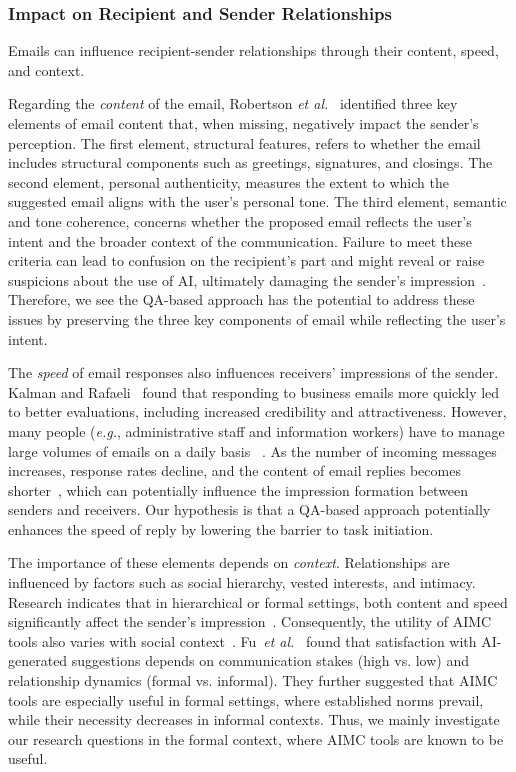 \subsubsection{Impact on Recipient and Sender Relationships}
Emails can influence recipient-sender relationships through their content, speed, and context. 

Regarding the \textit{content} of the email, Robertson \textit{et al.}~\cite{Robertson2021ICant} identified three key elements of email content that, when missing, negatively impact the sender’s perception.
The first element, structural features, refers to whether the email includes structural components such as greetings, signatures, and closings. 
The second element, personal authenticity, measures the extent to which the suggested email aligns with the user’s personal tone. 
The third element, semantic and tone coherence, concerns whether the proposed email reflects the user’s intent and the broader context of the communication.
Failure to meet these criteria can lead to confusion on the recipient’s part and might reveal or raise suspicions about the use of AI, ultimately damaging the sender’s impression~\cite{hohenstein2023artificial, Jakesch2019AI-Mediated, Liu2022Will}. 
Therefore, we see the QA-based approach has the potential to address these issues by preserving the three key components of email while reflecting the user’s intent.

The \textit{speed} of email responses also influences receivers' impressions of the sender. 
Kalman and Rafaeli~\cite{yoram2011online} found that responding to business emails more quickly led to better evaluations, including increased credibility and attractiveness.
However, many people (\textit{e.g.}, administrative staff and information workers) have to manage large volumes of emails on a daily basis ~\cite{McKinseySocialEconomy}. 
As the number of incoming messages increases, response rates decline, and the content of email replies becomes shorter~\cite{kooti2015evolution}, which can potentially influence the impression formation between senders and receivers.
Our hypothesis is that a QA-based approach potentially enhances the speed of reply by lowering the barrier to task initiation.

The importance of these elements depends on \textit{context}. 
Relationships are influenced by factors such as social hierarchy, vested interests, and intimacy. 
Research indicates that in hierarchical or formal settings, both content and speed significantly affect the sender’s impression~\cite{francis2015influence, stephens2011organizational}. 
Consequently, the utility of AIMC tools also varies with social context~\cite{fu2024text, Robertson2021ICant}. 
Fu~\textit{et al.}~\cite{fu2024text} found that satisfaction with AI-generated suggestions depends on communication stakes (high vs. low) and relationship dynamics (formal vs. informal). 
They further suggested that AIMC tools are especially useful in formal settings, where established norms prevail, while their necessity decreases in informal contexts.
Thus, we mainly investigate our research questions in the formal context, where AIMC tools are known to be useful.

